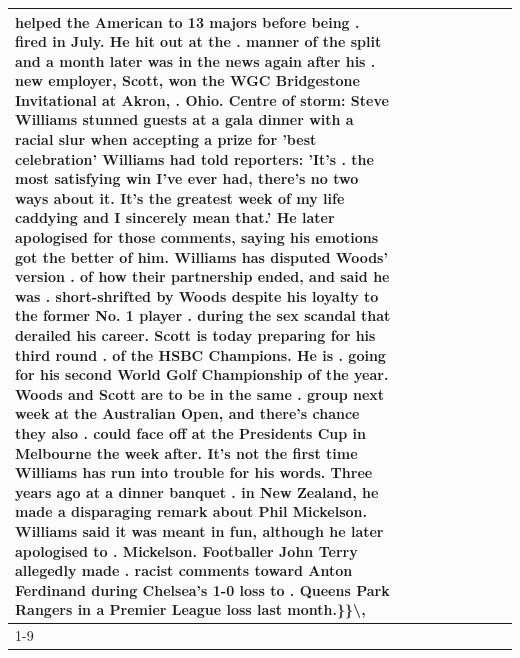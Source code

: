 \begin{table}[H]
\begin{tabular}{lllrlllll}
helped the American to 13 majors before being . fired in July. He hit out at the . manner of the split and a month later was in the news again after his . new employer, Scott, won the WGC Bridgestone Invitational at Akron, . Ohio. Centre of storm: Steve Williams stunned guests at a gala dinner with a racial slur when accepting a prize for 'best celebration' Williams had told reporters: 'It's . the most satisfying win I've ever had, there's no two ways about it. It's the greatest week of my life caddying and I sincerely mean that.' He later apologised for those comments, saying his emotions got the better of him. Williams has disputed Woods' version . of how their partnership ended, and said he was . short-shrifted by Woods despite his loyalty to the former No. 1 player . during the sex scandal that derailed his career. Scott is today preparing for his third round . of the HSBC Champions. He is . going for his second World Golf Championship of the year. Woods and Scott are to be in the same . group next week at the Australian Open, and there's chance they also . could face off at the Presidents Cup in Melbourne the week after. It's not the first time Williams has run into trouble for his words. Three years ago at a dinner banquet . in New Zealand, he made a disparaging remark about Phil Mickelson. Williams said it was meant in fun, although he later apologised to . Mickelson. Footballer John Terry allegedly made . racist comments toward Anton Ferdinand during Chelsea's 1-0 loss to . Queens Park Rangers in a Premier League loss last month.\}\}\textbackslash , \\
\cline{1-9}

\end{tabular}
\end{table}
